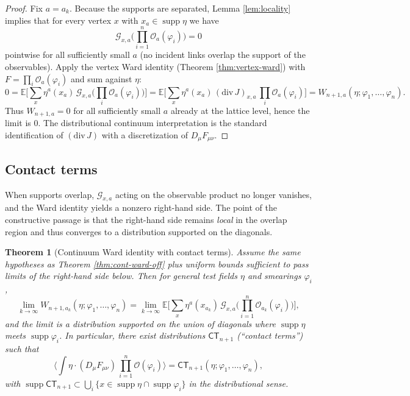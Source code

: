 \documentclass[11pt]{article}
\newtheorem{theorem}{Theorem}[section]
\theoremstyle{definition}
\newcommand{\E}{\mathbb{E}}
\newcommand{\1}{\mathbf{1}}
\newcommand{\supp}{\operatorname{supp}}
\begin{document}
\begin{proof}
Fix $a=a_k$.
Because the supports are separated, Lemma \ref{lem:locality} implies that for every vertex $x$ with $x_a\in\supp\eta$ we have
\begin{equation*}
  \mathcal{G}_{x,a}\Big(\prod_{i=1}^n \mathcal{O}_a(\varphi_i)\Big)=0
\end{equation*}
pointwise for all sufficiently small $a$ (no incident links overlap the support of the observables).
Apply the vertex Ward identity (Theorem \ref{thm:vertex-ward}) with $F=\prod_i \mathcal{O}_a(\varphi_i)$ and sum against $\eta$:
\begin{equation*}
0=\E\Big[\sum_x \eta^a(x_a)\,\mathcal{G}_{x,a}\Big(\prod_i \mathcal{O}_a(\varphi_i)\Big)\Big]
=\E\Big[\sum_x \eta^a(x_a)\,(\mathrm{div}\,J)_{x,a}\,\prod_i \mathcal{O}_a(\varphi_i)\Big]
= W_{n+1,a}(\eta;\varphi_1,\dots,\varphi_n).
\end{equation*}
Thus $W_{n+1,a}=0$ for all sufficiently small $a$ already at the lattice level, hence the limit is $0$.
The distributional continuum interpretation is the standard identification of $(\mathrm{div}\,J)$ with a discretization of $D_\mu F_{\mu\nu}$.
\end{proof}

\subsection{Contact terms}
When supports overlap, $\mathcal{G}_{x,a}$ acting on the observable product no longer vanishes, and the Ward identity yields a nonzero right-hand side.
The point of the constructive passage is that the right-hand side remains 
\emph{local} in the overlap region and thus converges to a distribution supported on the diagonals.

\begin{theorem}[Continuum Ward identity with contact terms]\label{thm:cont-ward-contact}
Assume the same hypotheses as Theorem \ref{thm:cont-ward-off} plus uniform bounds sufficient to pass limits of the right-hand side below.
Then for general test fields $\eta$ and smearings $\varphi_i$,
\begin{equation}\label{eq:ward-contact}
  \lim_{k\to\infty} W_{n+1,a_k}(\eta;\varphi_1,\dots,\varphi_n)
  = \lim_{k\to\infty}\E\Big[\sum_x \eta^a(x_{a_k})\,\mathcal{G}_{x,a}\Big(\prod_{i=1}^n \mathcal{O}_{a_k}(\varphi_i)\Big)\Big],
\end{equation}
and the limit is a distribution supported on the union of diagonals where $\supp\eta$ meets $\supp\varphi_i$.
In particular, there exist distributions $\mathsf{CT}_{n+1}$ (``contact terms'') such that
\begin{equation}\label{eq:ct-form}
  \Big\langle \int \eta\cdot (D_\mu F_{\mu\nu})\, \prod_{i=1}^n \mathcal{O}(\varphi_i)\Big\rangle
  = \mathsf{CT}_{n+1}(\eta;\varphi_1,\dots,\varphi_n),
\end{equation}
with $\supp\mathsf{CT}_{n+1}\subset \bigcup_i \{x\in \supp\eta\cap \supp\varphi_i\}$ in the distributional sense.
\end{theorem}
\end{document}
